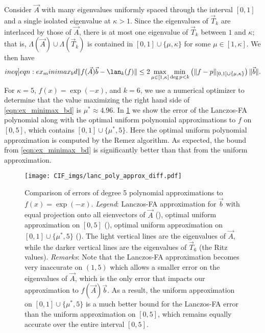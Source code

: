 \begin{example}
\label{ex:unif_discrete}
Consider \( \vec{A} \) with many eigenvalues uniformly spaced through the interval \( [0,1] \) and a single isolated eigenvalue at \( \kappa > 1 \).
Since the eigenvalues of \( \vec{T}_k \) are interlaced by those of \( \vec A \), there is at most one eigenvalue of \( \vec{T}_k \) between \( 1 \) and \( \kappa \); that is, \( \Lambda( \vec{A} )\cup\Lambda( \vec{T}_k ) \) is contained in \( [0,1] \cup \{ \mu , \kappa \} \) for some \( \mu\in[1,\kappa] \).
We then have
\begin{align}
\label[ineq]{eqn:ex_minimax_bd}
    \| f(\vec{A}) \vec{b} - \lan_k(f) \| 
\leq 2 \max_{\mu\in[1,\kappa]} \min_{\deg p<k} \left( \| f-p \|_{[0,1]\cup\{\mu,\kappa\}} \right) \| \vec{b} \|.
\end{align}
For \( \kappa = 5\), \( f(x) = \exp(-x) \), and \( k=6 \), we use a numerical optimizer to determine that the value  maximizing the right hand side of \cref{eqn:ex_minimax_bd} is  \( \mu^*\approx 4.96\).
In \cref{fig:lanc_poly_approx} we show the error of the Lanczos-FA polynomial along with the optimal uniform polynomial approximations to \( f \) on \( [0,5] \), which contains \( [0,1]\cup\{\mu^*,5\} \).
Here the optimal uniform polynomial approximation is computed by the Remez algorithm.
As expected, the bound from \cref{eqn:ex_minimax_bd}  is significantly better than that from the uniform approximation.

\begin{figure}[ht]
    \texttt{[image: CIF\_imgs/lanc\_poly\_approx\_diff.pdf]}

   \caption{
    Comparison of errors of degree 5 polynomial approximations to \( f(x) = \exp(-x) \).
    \emph{Legend}:
    Lanczos-FA approximation for $\vec b$ with equal projection onto all eienvectors of $\vec A$ ({\protect{}}), 
    optimal uniform approximation on \( [0,5] \) ({\protect{}}), 
    optimal uniform approximation on \( [0,1]\cup\{\mu^*,5\} \) ({\protect{}}).
    The light vertical lines are the eigenvalues of \( \vec{A} \), while the darker vertical lines are the eigenvalues of \( \vec T_6 \) (the Ritz values).
    \emph{Remarks}: 
    Note that the Lanczos-FA approximation becomes very inaccurate on \( (1,5) \) which allows a smaller error on the eigenvalues of $\vec A$, which is the only error that impacts our approximation to $f(\vec A)\vec b$.
    As a result, the uniform approximation on \( [0,1] \cup \{\mu^*,5\} \) is a much better bound for the Lanczos-FA error than the uniform approximation on \( [0,5] \), which remains equally accurate over the entire interval \([0,5]\). 
    }
    \label{fig:lanc_poly_approx}
\end{figure}
\end{example}




